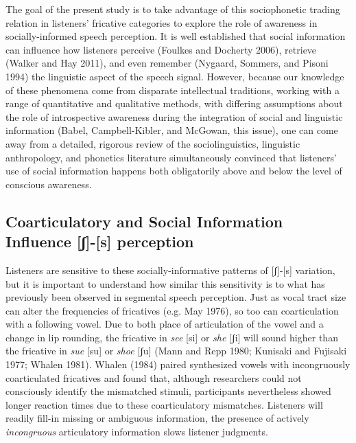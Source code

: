 \documentclass[
  letterpaper,
  DIV=11,
  numbers=noendperiod]{scrartcl}
\begin{document}
The goal of the present study is to take advantage of this sociophonetic
trading relation in listeners' fricative categories to explore the role
of awareness in socially-informed speech perception. It is well
established that social information can influence how listeners perceive
(Foulkes and Docherty 2006), retrieve (Walker and Hay 2011), and even
remember (Nygaard, Sommers, and Pisoni 1994) the linguistic aspect of
the speech signal. However, because our knowledge of these phenomena
come from disparate intellectual traditions, working with a range of
quantitative and qualitative methods, with differing assumptions about
the role of introspective awareness during the integration of social and
linguistic information (Babel, Campbell-Kibler, and McGowan, this
issue), one can come away from a detailed, rigorous review of the
sociolinguistics, linguistic anthropology, and phonetics literature
simultaneously convinced that listeners' use of social information
happens both obligatorily above and below the level of conscious
awareness.

\subsection{Coarticulatory and Social Information Influence
{[}ʃ{]}-{[}s{]} perception}\label{sec-coart-soc}

Listeners are sensitive to these socially-informative patterns of
{[}ʃ{]}-{[}s{]} variation, but it is important to understand how similar
this sensitivity is to what has previously been observed in segmental
speech perception. Just as vocal tract size can alter the frequencies of
fricatives (e.g. May 1976), so too can coarticulation with a following
vowel. Due to both place of articulation of the vowel and a change in
lip rounding, the fricative in \emph{see} {[}si{]} or \emph{she}
{[}ʃi{]} will sound higher than the fricative in \emph{sue} {[}su{]} or
\emph{shoe} {[}ʃu{]} (Mann and Repp 1980; Kunisaki and Fujisaki 1977;
Whalen 1981). Whalen (1984) paired synthesized vowels with incongruously
coarticulated fricatives and found that, although researchers could not
consciously identify the mismatched stimuli, participants nevertheless
showed longer reaction times due to these coarticulatory mismatches.
Listeners will readily fill-in missing or ambiguous information, the
presence of actively \emph{incongruous} articulatory information slows
listener judgments.
\end{document}
